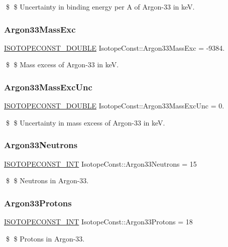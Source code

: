 \$ \$ Uncertainty in binding energy per A of Argon-\/33 in keV. \mbox{\label{group___isotope_const-_argon-_ar33_ga68ee64029309897a7736ba54b5a2399d}} 
\subsubsection{\texorpdfstring{Argon33\+Mass\+Exc}{Argon33MassExc}}
{\footnotesize\ttfamily \mbox{\hyperlink{group___isotope_const-_macros_ga8f45a7272ce02c0b4c65c44636ed719a}{I\+S\+O\+T\+O\+P\+E\+C\+O\+N\+S\+T\+\_\+\+D\+O\+U\+B\+LE}} Isotope\+Const\+::\+Argon33\+Mass\+Exc = -\/9384.}

\$ \$ Mass excess of Argon-\/33 in keV. \mbox{\label{group___isotope_const-_argon-_ar33_ga58bfece808c38acfa8dc6a66e4222e6e}} 
\subsubsection{\texorpdfstring{Argon33\+Mass\+Exc\+Unc}{Argon33MassExcUnc}}
{\footnotesize\ttfamily \mbox{\hyperlink{group___isotope_const-_macros_ga8f45a7272ce02c0b4c65c44636ed719a}{I\+S\+O\+T\+O\+P\+E\+C\+O\+N\+S\+T\+\_\+\+D\+O\+U\+B\+LE}} Isotope\+Const\+::\+Argon33\+Mass\+Exc\+Unc = 0.}

\$ \$ Uncertainty in mass excess of Argon-\/33 in keV. \mbox{\label{group___isotope_const-_argon-_ar33_gafa90838cfb346f27cbba1aa11280362c}} 
\subsubsection{\texorpdfstring{Argon33\+Neutrons}{Argon33Neutrons}}
{\footnotesize\ttfamily \mbox{\hyperlink{group___isotope_const-_macros_ga5f18360b3e99483a35c32d789e62621c}{I\+S\+O\+T\+O\+P\+E\+C\+O\+N\+S\+T\+\_\+\+I\+NT}} Isotope\+Const\+::\+Argon33\+Neutrons = 15}

\$ \$ Neutrons in Argon-\/33. \mbox{\label{group___isotope_const-_argon-_ar33_ga6caf2e641aa7110a4101a483b23ae301}} 
\subsubsection{\texorpdfstring{Argon33\+Protons}{Argon33Protons}}
{\footnotesize\ttfamily \mbox{\hyperlink{group___isotope_const-_macros_ga5f18360b3e99483a35c32d789e62621c}{I\+S\+O\+T\+O\+P\+E\+C\+O\+N\+S\+T\+\_\+\+I\+NT}} Isotope\+Const\+::\+Argon33\+Protons = 18}

\$ \$ Protons in Argon-\/33. 